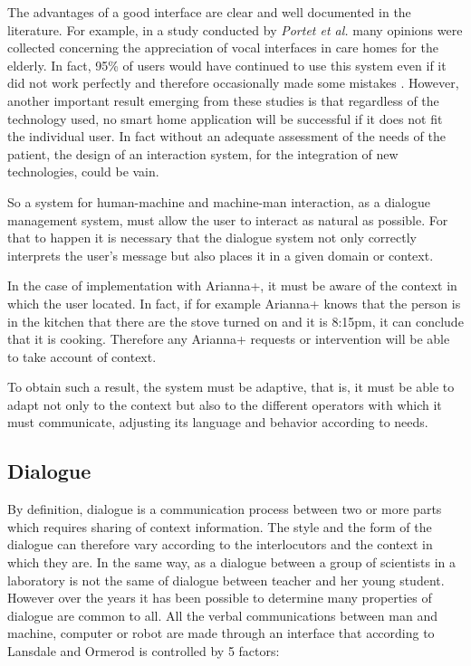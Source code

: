 \documentclass{thesisreport}
\begin{document}
 The advantages of a good interface are clear and well documented in the literature.
 For example, in a study conducted by \textit{Portet et al.} many opinions were collected concerning the appreciation of vocal interfaces in care homes for the elderly. In fact, 95\% of users would have continued to use this system even if it did not work perfectly and therefore occasionally made some mistakes \cite{portet2013design}.
 However, another important result emerging from these studies is that regardless of the technology used, no smart home application will be successful if it does not fit the individual user.
 In fact without an adequate assessment of the needs of the patient, the design of an interaction system, for the integration of new technologies, could be vain.
 
 So a system for human-machine and machine-man interaction, as a dialogue management system, must allow the user to interact as natural as possible. For that to happen it is necessary that the dialogue system not only correctly interprets the user's message but also places it in a given domain or context.
 
 In the case of implementation with Arianna+, it must be aware of the context in which the user located. In fact, if for example Arianna+ knows that the person is in the kitchen that there are the stove turned on and it is 8:15pm, it can conclude that it is cooking. Therefore any Arianna+ requests or intervention will be able to take account of context.

 To obtain such a result, the system must be adaptive, that is, it must be able to adapt not only to the context but also to the different operators with which it must communicate, adjusting its language and behavior according to needs.

 \subsection{Dialogue}
 By definition, dialogue is a communication process between two or more parts which requires sharing of context information. The style and the form of the dialogue can therefore vary according to the interlocutors and the context in which they are. In the same way, as a dialogue between a group of scientists in a laboratory is not the same of dialogue between teacher and her young student.
 However over the years it has been possible to determine many properties of dialogue are common to all.
 All the verbal communications between man and machine, computer or robot are made through an interface that according to Lansdale and Ormerod \cite{mccourt1996understanding} is controlled by 5 factors:
\end{document}
